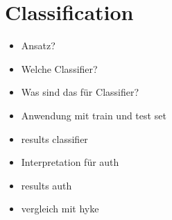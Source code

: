 \section{Classification}

\begin{itemize}
	\item Ansatz?
    \item Welche Classifier?
    \item Was sind das für Classifier?
    \item Anwendung mit train und test set
    \item results classifier
    \item Interpretation für auth
    \item results auth
    \item vergleich mit hyke
\end{itemize}


